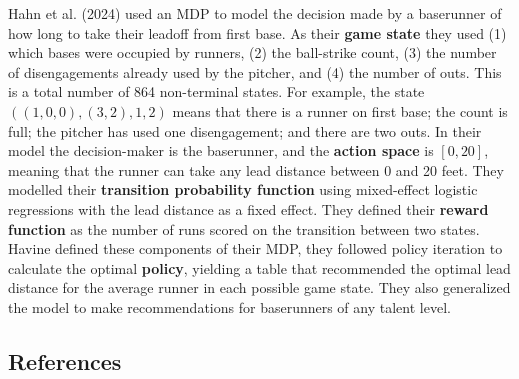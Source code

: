 \documentclass{article}
\begin{document}
    Hahn et al. (2024) used an MDP to model the decision made by a baserunner of how long to take their leadoff from first base. As their {\bf game state} they used (1) which bases were occupied by runners, (2) the ball-strike count, (3) the number of disengagements already used by the pitcher, and (4) the number of outs. This is a total number of 864 non-terminal states. For example, the state $((1, 0, 0), (3, 2), 1, 2)$ means that there is a runner on first base; the count is full; the pitcher has used one disengagement; and there are two outs. In their model the decision-maker is the baserunner, and the {\bf action space} is $[0, 20]$, meaning that the runner can take any lead distance between 0 and 20 feet. They modelled their {\bf transition probability function} using mixed-effect logistic regressions with the lead distance as a fixed effect. They defined their {\bf reward function} as the number of runs scored on the transition between two states. Havine defined these components of their MDP, they followed policy iteration to calculate the optimal {\bf policy}, yielding a table that recommended the optimal lead distance for the average runner in each possible game state. They also generalized the model to make recommendations for baserunners of any talent level.

    \subsection*{\sc References}
\end{document}
